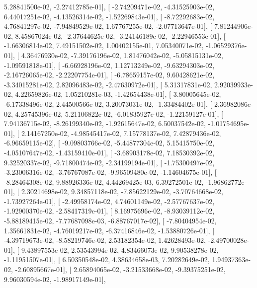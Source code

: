 \documentclass{article}
\begin{document}
          5.28841500e-02,  -2.27412785e-01],
       [ -2.74209471e-02,  -4.31525903e-02,   6.44017251e-02,
         -4.13526314e-02,  -1.52269843e-01],
       [ -8.72292683e-02,   4.76841297e-02,  -7.94849529e-02,
          1.67767255e-02,  -2.07713647e-01],
       [  7.81244906e-02,   8.45867024e-02,  -2.37644625e-02,
         -3.24146189e-02,  -2.22946553e-01],
       [ -1.66306814e-02,   7.49151502e-02,   1.00402155e-01,
          7.05340071e-02,  -1.06529376e-01],
       [  4.36476930e-02,  -7.39176196e-02,   1.81476042e-02,
         -5.05815131e-02,  -1.09591818e-01],
       [ -6.66928196e-02,   1.12713249e-02,  -9.63294303e-02,
         -2.16726065e-02,  -2.22207754e-01],
       [ -6.78659157e-02,   9.60428621e-02,  -3.34015281e-02,
          2.82096483e-02,  -2.47630972e-01],
       [  5.31317831e-02,   2.92039933e-02,   4.22659826e-02,
          1.05210281e-03,  -1.42654438e-01],
       [  3.80005645e-02,  -6.17338496e-02,   2.44500566e-02,
          3.20073031e-02,  -1.33484402e-01],
       [  2.36982086e-02,   4.25745396e-02,   5.21106822e-02,
         -6.01835927e-02,  -1.22159127e-01],
       [  7.94136715e-02,  -8.26199340e-02,  -1.92615647e-02,
          6.50037542e-02,  -1.01754695e-01],
       [  2.14167250e-02,  -4.98545417e-02,   7.15778137e-02,
          7.42879436e-02,  -6.96659115e-02],
       [ -9.09803766e-02,  -5.44877304e-02,   5.15415750e-02,
         -4.05107647e-02,  -1.43159410e-01],
       [ -3.68903178e-02,   7.18530392e-02,   9.32520337e-02,
         -9.71800474e-02,  -2.34199194e-01],
       [ -1.75300497e-02,  -3.23006316e-02,  -3.76767087e-02,
         -9.96509480e-02,  -1.14604675e-01],
       [ -8.28464308e-02,   9.88926336e-02,   4.44269425e-03,
          6.39272501e-02,  -1.96862772e-01],
       [  2.30214698e-02,   9.34857118e-02,  -7.85622129e-02,
         -3.70764668e-02,  -1.73927264e-01],
       [ -2.49958174e-02,   4.74601149e-02,  -2.57767637e-02,
         -1.92900370e-02,  -2.58417319e-01],
       [  8.16975696e-02,  -8.93039112e-02,  -5.88189415e-02,
         -7.77687098e-03,  -6.88767017e-02],
       [ -7.80404954e-02,   1.35661831e-02,  -4.76019217e-02,
         -6.37416846e-02,  -1.53880726e-01],
       [ -4.39719673e-02,  -8.58219746e-02,   2.53182354e-02,
          1.42628493e-02,  -2.49700028e-01],
       [  9.43897553e-02,   2.53543994e-02,   4.83466073e-02,
          9.90538278e-02,  -1.11951507e-01],
       [  6.50350548e-02,   4.38634658e-03,   7.20282649e-02,
          1.94937363e-02,  -2.60895667e-01],
       [  2.65894065e-02,  -3.21533668e-02,  -9.39375251e-02,
          9.96030594e-02,  -1.98917149e-01],
\end{document}
